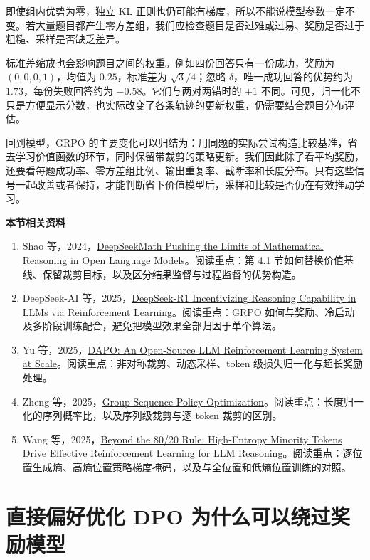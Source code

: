 即使组内优势为零，独立 KL 正则也仍可能有梯度，所以不能说模型参数一定不变。若大量题目都产生零方差组，我们应检查题目是否过难或过易、奖励是否过于粗糙、采样是否缺乏差异。

标准差缩放也会影响题目之间的权重。例如四份回答只有一份成功，奖励为 $(0,0,0,1)$，均值为 $0.25$，标准差为 $\sqrt{3}/4$；忽略 $\delta$，唯一成功回答的优势约为 $1.73$，每份失败回答约为 $-0.58$。它们与两对两错时的 $\pm1$ 不同。可见，归一化不只是方便显示分数，也实际改变了各条轨迹的更新权重，仍需要结合题目分布评估。

回到模型，GRPO 的主要变化可以归结为：用同题的实际尝试构造比较基准，省去学习价值函数的环节，同时保留带裁剪的策略更新。我们因此除了看平均奖励，还要看每题成功率、零方差组比例、输出重复率、截断率和长度分布。只有这些信号一起改善或者保持，才能判断省下价值模型后，采样和比较是否仍在有效推动学习。

\textbf{本节相关资料}
\begin{enumerate}
    \item Shao 等，2024，\href{https://arxiv.org/abs/2402.03300}{DeepSeekMath Pushing the Limits of Mathematical Reasoning in Open Language Models}。阅读重点：第 4.1 节如何替换价值基线、保留裁剪目标，以及区分结果监督与过程监督的优势构造。
    \item DeepSeek-AI 等，2025，\href{https://arxiv.org/abs/2501.12948}{DeepSeek-R1 Incentivizing Reasoning Capability in LLMs via Reinforcement Learning}。阅读重点：GRPO 如何与奖励、冷启动及多阶段训练配合，避免把模型效果全部归因于单个算法。
    \item Yu 等，2025，\href{https://arxiv.org/abs/2503.14476}{DAPO: An Open-Source LLM Reinforcement Learning System at Scale}。阅读重点：非对称裁剪、动态采样、token 级损失归一化与超长奖励处理。
    \item Zheng 等，2025，\href{https://arxiv.org/abs/2507.18071}{Group Sequence Policy Optimization}。阅读重点：长度归一化的序列概率比，以及序列级裁剪与逐 token 裁剪的区别。
    \item Wang 等，2025，\href{https://arxiv.org/abs/2506.01939}{Beyond the 80/20 Rule: High-Entropy Minority Tokens Drive Effective Reinforcement Learning for LLM Reasoning}。阅读重点：逐位置生成熵、高熵位置策略梯度掩码，以及与全位置和低熵位置训练的对照。
\end{enumerate}

\section{直接偏好优化 DPO 为什么可以绕过奖励模型}\label{直接偏好优化 DPO 为什么可以绕过奖励模型}

